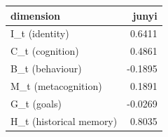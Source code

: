 \begin{tabular}{lr}
\toprule
dimension & junyi \\
\midrule
I\_t (identity) & 0.6411 \\
C\_t (cognition) & 0.4861 \\
B\_t (behaviour) & -0.1895 \\
M\_t (metacognition) & 0.1891 \\
G\_t (goals) & -0.0269 \\
H\_t (historical memory) & 0.8035 \\
\bottomrule
\end{tabular}
